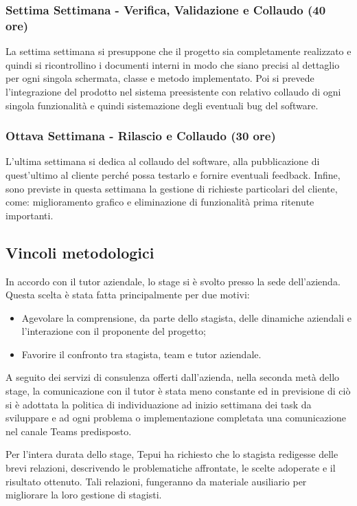 \subsubsection*{Settima Settimana - Verifica, Validazione e Collaudo (40 ore)}
La settima settimana si presuppone che il progetto sia completamente realizzato e quindi si ricontrollino i documenti interni in modo che siano precisi al dettaglio per ogni singola schermata, classe e metodo implementato.
Poi si prevede l'integrazione del prodotto nel sistema preesistente con relativo collaudo di ogni singola funzionalità e quindi sistemazione degli eventuali bug del software.


\subsubsection*{Ottava Settimana - Rilascio e Collaudo (30 ore)}
L'ultima settimana si dedica al collaudo del software, alla pubblicazione di quest'ultimo al cliente perché possa testarlo e fornire eventuali feedback. Infine, sono previste in questa settimana la gestione di richieste particolari del cliente, come: miglioramento grafico e  eliminazione di funzionalità prima ritenute importanti.


\subsection{Vincoli metodologici}
In accordo con il tutor aziendale, lo stage si è svolto presso la sede dell'azienda. Questa scelta è stata fatta principalmente per due motivi: 
\begin{itemize}
	\item Agevolare la comprensione, da parte dello stagista, delle dinamiche aziendali e l’interazione con il proponente del progetto; 
	\item Favorire il confronto tra stagista, team e tutor aziendale.
\end{itemize}
A seguito dei servizi di consulenza offerti dall'azienda, nella seconda metà dello stage, la comunicazione con il tutor è stata meno constante ed in previsione di ciò si è adottata la politica di individuazione ad inizio settimana dei task da sviluppare e ad ogni problema o implementazione completata una comunicazione nel canale Teams predisposto.

Per l'intera durata dello stage, Tepui ha richiesto che lo stagista redigesse delle brevi relazioni, descrivendo le problematiche affrontate, le scelte adoperate e il risultato ottenuto. Tali relazioni, fungeranno da materiale ausiliario per migliorare la loro gestione di stagisti.

